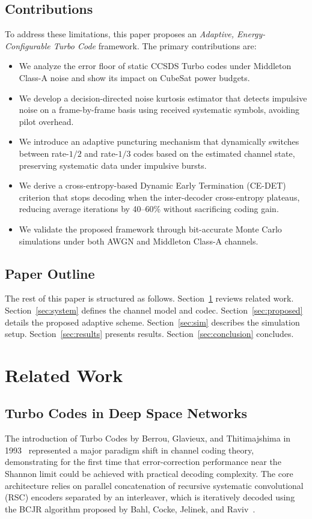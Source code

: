 \documentclass[journal,twocolumn]{IEEEtran}
\begin{document}
\subsection{Contributions}
To address these limitations, this paper proposes an \emph{Adaptive, Energy-Configurable Turbo Code} framework. The primary contributions are:
\begin{itemize}
  \item We analyze the error floor of static CCSDS Turbo codes under Middleton Class-A noise and show its impact on CubeSat power budgets.
  \item We develop a decision-directed noise kurtosis estimator that detects impulsive noise on a frame-by-frame basis using received systematic symbols, avoiding pilot overhead.
  \item We introduce an adaptive puncturing mechanism that dynamically switches between rate-$1/2$ and rate-$1/3$ codes based on the estimated channel state, preserving systematic data under impulsive bursts.
  \item We derive a cross-entropy-based Dynamic Early Termination (CE-DET) criterion that stops decoding when the inter-decoder cross-entropy plateaus, reducing average iterations by 40--60\% without sacrificing coding gain.
  \item We validate the proposed framework through bit-accurate Monte Carlo simulations under both AWGN and Middleton Class-A channels.
\end{itemize}

\subsection{Paper Outline}
The rest of this paper is structured as follows.
Section~\ref{sec:related} reviews related work.
Section~\ref{sec:system} defines the channel model and codec.
Section~\ref{sec:proposed} details the proposed adaptive scheme.
Section~\ref{sec:sim} describes the simulation setup.
Section~\ref{sec:results} presents results.
Section~\ref{sec:conclusion} concludes.

\section{Related Work}
\label{sec:related}

\subsection{Turbo Codes in Deep Space Networks}
The introduction of Turbo Codes by Berrou, Glavieux, and Thitimajshima in 1993~\cite{berrou1993turbo} represented a major paradigm shift in channel coding theory, demonstrating for the first time that error-correction performance near the Shannon limit could be achieved with practical decoding complexity. The core architecture relies on parallel concatenation of recursive systematic convolutional (RSC) encoders separated by an interleaver, which is iteratively decoded using the BCJR algorithm proposed by Bahl, Cocke, Jelinek, and Raviv~\cite{bahl1974bcjr}.
\end{document}
